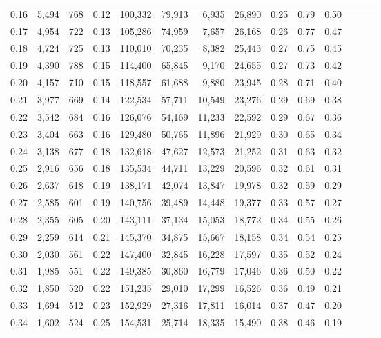 \begin{tabular}{rrrrrrrrrrrrrr}
0.16 &  5,494 &  768 &  0.12 &  100,332 &   79,913 &   6,935 &  26,890 &  0.25 &  0.79 &      0.50 \\
0.17 &  4,954 &  722 &  0.13 &  105,286 &   74,959 &   7,657 &  26,168 &  0.26 &  0.77 &      0.47 \\
0.18 &  4,724 &  725 &  0.13 &  110,010 &   70,235 &   8,382 &  25,443 &  0.27 &  0.75 &      0.45 \\
0.19 &  4,390 &  788 &  0.15 &  114,400 &   65,845 &   9,170 &  24,655 &  0.27 &  0.73 &      0.42 \\
0.20 &  4,157 &  710 &  0.15 &  118,557 &   61,688 &   9,880 &  23,945 &  0.28 &  0.71 &      0.40 \\
0.21 &  3,977 &  669 &  0.14 &  122,534 &   57,711 &  10,549 &  23,276 &  0.29 &  0.69 &      0.38 \\
0.22 &  3,542 &  684 &  0.16 &  126,076 &   54,169 &  11,233 &  22,592 &  0.29 &  0.67 &      0.36 \\
0.23 &  3,404 &  663 &  0.16 &  129,480 &   50,765 &  11,896 &  21,929 &  0.30 &  0.65 &      0.34 \\
0.24 &  3,138 &  677 &  0.18 &  132,618 &   47,627 &  12,573 &  21,252 &  0.31 &  0.63 &      0.32 \\
0.25 &  2,916 &  656 &  0.18 &  135,534 &   44,711 &  13,229 &  20,596 &  0.32 &  0.61 &      0.31 \\
0.26 &  2,637 &  618 &  0.19 &  138,171 &   42,074 &  13,847 &  19,978 &  0.32 &  0.59 &      0.29 \\
0.27 &  2,585 &  601 &  0.19 &  140,756 &   39,489 &  14,448 &  19,377 &  0.33 &  0.57 &      0.27 \\
0.28 &  2,355 &  605 &  0.20 &  143,111 &   37,134 &  15,053 &  18,772 &  0.34 &  0.55 &      0.26 \\
0.29 &  2,259 &  614 &  0.21 &  145,370 &   34,875 &  15,667 &  18,158 &  0.34 &  0.54 &      0.25 \\
0.30 &  2,030 &  561 &  0.22 &  147,400 &   32,845 &  16,228 &  17,597 &  0.35 &  0.52 &      0.24 \\
0.31 &  1,985 &  551 &  0.22 &  149,385 &   30,860 &  16,779 &  17,046 &  0.36 &  0.50 &      0.22 \\
0.32 &  1,850 &  520 &  0.22 &  151,235 &   29,010 &  17,299 &  16,526 &  0.36 &  0.49 &      0.21 \\
0.33 &  1,694 &  512 &  0.23 &  152,929 &   27,316 &  17,811 &  16,014 &  0.37 &  0.47 &      0.20 \\
0.34 &  1,602 &  524 &  0.25 &  154,531 &   25,714 &  18,335 &  15,490 &  0.38 &  0.46 &      0.19 \\

\end{tabular}
